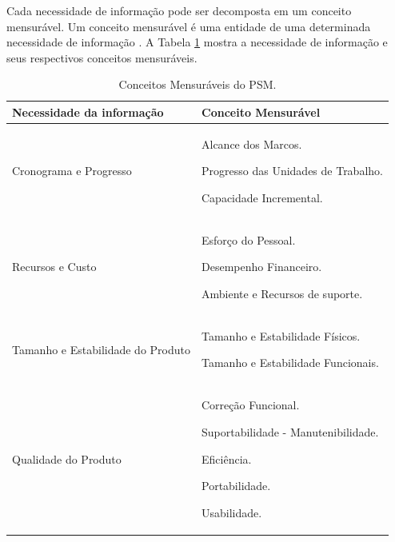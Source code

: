  Cada necessidade de informação pode ser decomposta em um conceito mensurável. Um conceito mensurável é uma entidade de uma determinada necessidade de informação \cite{card_jones}.  A Tabela \ref{tipos_metricas3} mostra a necessidade de informação e seus respectivos conceitos mensuráveis.

 \begin{longtable}{|p{185pt}|p{200pt}|}
 	\caption{Conceitos Mensuráveis do PSM.} \label{tipos_metricas3}\\
 	\hline
 	 {\raggedright \textbf{Necessidade da informação}}
 	 & {\raggedright \textbf{Conceito Mensurável}}\\
 	
 	\hline
 	 {\raggedright Cronograma e Progresso}
 	 & {\raggedright 
 	                  Alcance dos Marcos.
 	                  
 	                  Progresso das Unidades de Trabalho.
 	                  
 	                  Capacidade Incremental.
 	                 
	   }\\
 	
 	\hline
 	 {\raggedright Recursos e Custo}
 	 & {\raggedright 
 	                 Esforço do Pessoal.
 	                 
 	                 Desempenho Financeiro.
 	                 
 	              Ambiente e Recursos de suporte.
 	                
 	               } \\
 	
 	\hline
 	 {\raggedright Tamanho e Estabilidade do Produto} 
 	 & {\raggedright  
 	 
	
			 Tamanho e Estabilidade Físicos.
			 
 	                 Tamanho e Estabilidade Funcionais.
		
			
 	                 } \\

 	\hline
 	 {\raggedright Qualidade do Produto}
 	 & {\raggedright
 	                  Correção Funcional.
 	                  
 	                 Suportabilidade - Manutenibilidade.
 	                 
 	                Eficiência.
 	                
 	                Portabilidade.
 	                
 	                  Usabilidade.
 	                  
}
\end{longtable}
